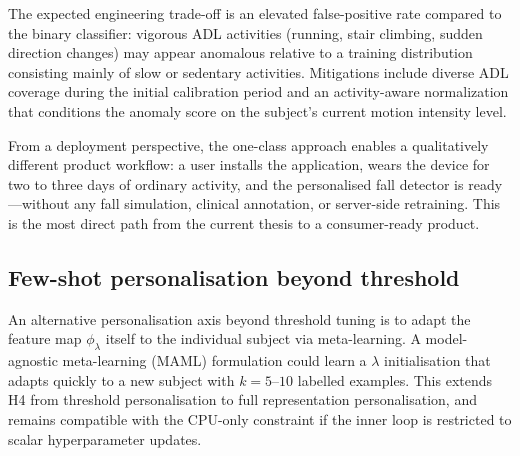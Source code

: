 The expected engineering trade-off is an elevated false-positive rate compared to
the binary classifier: vigorous ADL activities (running, stair climbing, sudden
direction changes) may appear anomalous relative to a training distribution consisting
mainly of slow or sedentary activities.  Mitigations include diverse ADL coverage
during the initial calibration period and an activity-aware normalization that
conditions the anomaly score on the subject's current motion intensity level.

From a deployment perspective, the one-class approach enables a qualitatively
different product workflow: a user installs the application, wears the device for
two to three days of ordinary activity, and the personalised fall detector is
ready---without any fall simulation, clinical annotation, or server-side retraining.
This is the most direct path from the current thesis to a consumer-ready product.

\subsection{Few-shot personalisation beyond threshold}

An alternative personalisation axis beyond threshold tuning is to adapt the feature
map $\phi_\lambda$ itself to the individual subject via meta-learning.  A model-agnostic
meta-learning (MAML) formulation could learn a $\lambda$ initialisation that adapts
quickly to a new subject with $k=5$--$10$ labelled examples.  This extends H4 from
threshold personalisation to full representation personalisation, and remains
compatible with the CPU-only constraint if the inner loop is restricted to scalar
hyperparameter updates.


